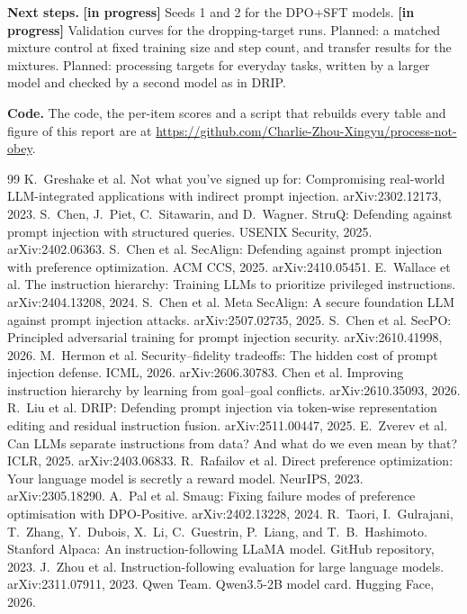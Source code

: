 \documentclass{article}
\newcommand{\inprog}{\textbf{[in progress]}}
\begin{document}
\textbf{Next steps.} \inprog{} Seeds 1 and 2 for the DPO+SFT models. \inprog{} Validation curves for the dropping-target runs. Planned: a matched mixture control at fixed training size and step count, and transfer results for the mixtures. Planned: processing targets for everyday tasks, written by a larger model and checked by a second model as in DRIP.

\textbf{Code.} The code, the per-item scores and a script that rebuilds every table and figure of this report are at \url{https://github.com/Charlie-Zhou-Xingyu/process-not-obey}.

\small
\begin{thebibliography}{99}
\setlength{\itemsep}{0pt}
 K.~Greshake et al. Not what you've signed up for: Compromising real-world LLM-integrated applications with indirect prompt injection. arXiv:2302.12173, 2023.
 S.~Chen, J.~Piet, C.~Sitawarin, and D.~Wagner. StruQ: Defending against prompt injection with structured queries. USENIX Security, 2025. arXiv:2402.06363.
 S.~Chen et al. SecAlign: Defending against prompt injection with preference optimization. ACM CCS, 2025. arXiv:2410.05451.
 E.~Wallace et al. The instruction hierarchy: Training LLMs to prioritize privileged instructions. arXiv:2404.13208, 2024.
 S.~Chen et al. Meta SecAlign: A secure foundation LLM against prompt injection attacks. arXiv:2507.02735, 2025.
 S.~Chen et al. SecPO: Principled adversarial training for prompt injection security. arXiv:2610.41998, 2026.
 M.~Hermon et al. Security--fidelity tradeoffs: The hidden cost of prompt injection defense. ICML, 2026. arXiv:2606.30783.
 Chen et al. Improving instruction hierarchy by learning from goal--goal conflicts. arXiv:2610.35093, 2026.
 R.~Liu et al. DRIP: Defending prompt injection via token-wise representation editing and residual instruction fusion. arXiv:2511.00447, 2025.
 E.~Zverev et al. Can LLMs separate instructions from data? And what do we even mean by that? ICLR, 2025. arXiv:2403.06833.
 R.~Rafailov et al. Direct preference optimization: Your language model is secretly a reward model. NeurIPS, 2023. arXiv:2305.18290.
 A.~Pal et al. Smaug: Fixing failure modes of preference optimisation with DPO-Positive. arXiv:2402.13228, 2024.
 R.~Taori, I.~Gulrajani, T.~Zhang, Y.~Dubois, X.~Li, C.~Guestrin, P.~Liang, and T.~B.~Hashimoto. Stanford Alpaca: An instruction-following LLaMA model. GitHub repository, 2023.
 J.~Zhou et al. Instruction-following evaluation for large language models. arXiv:2311.07911, 2023.
 Qwen Team. Qwen3.5-2B model card. Hugging Face, 2026.
\end{thebibliography}
\normalsize
\end{document}
